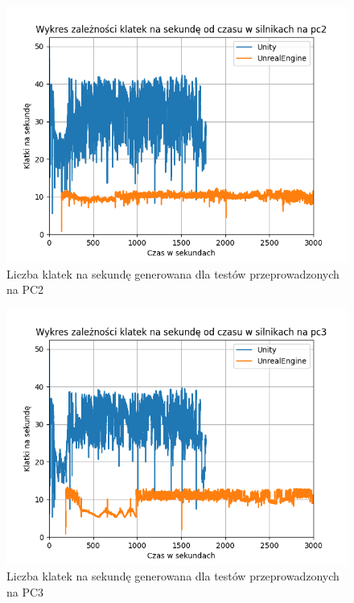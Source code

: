 \documentclass[12pt,twoside]{article}
\begin{document}
\begin{figure}[ht]
    \centering
    \includegraphics[width=16cm]{figures/FPSPlots/pc2searchedDataName.png}
    \caption{Liczba klatek na sekundę generowana dla testów przeprowadzonych na PC2}
    \label{Fig:PC2Tests}
\end{figure}        

\begin{figure}[ht]
    \centering
    \includegraphics[width=16cm]{figures/FPSPlots/pc3searchedDataName.png}
    \caption{Liczba klatek na sekundę generowana dla testów przeprowadzonych na PC3}
    \label{Fig:PC3Tests}
\end{figure}        
\end{document}

